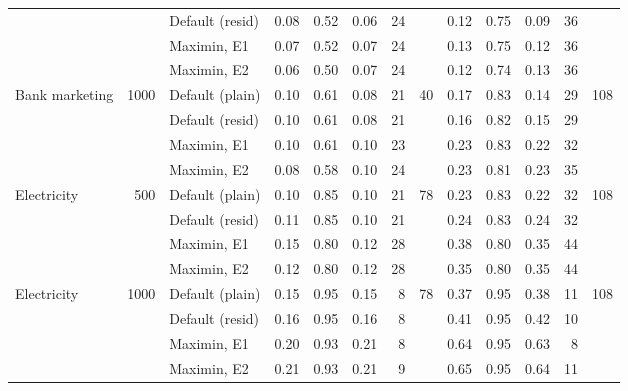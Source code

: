 {\begin{tabular}{lrl rr rrr rr rrr}
 &  & Default (resid) & 0.08 & 0.52 & 0.06 & 24 &  & 0.12 & 0.75 & 0.09 & 36 &  \\
 &  & Maximin, E1 & 0.07 & 0.52 & 0.07 & 24 &  & 0.13 & 0.75 & 0.12 & 36 &  \\
 &  & Maximin, E2 & 0.06 & 0.50 & 0.07 & 24 &  & 0.12 & 0.74 & 0.13 & 36 &  \\
\addlinespace
Bank marketing & 1000 & Default (plain) & 0.10 & 0.61 & 0.08 & 21 & 40 & 0.17 & 0.83 & 0.14 & 29 & 108 \\
 &  & Default (resid) & 0.10 & 0.61 & 0.08 & 21 &  & 0.16 & 0.82 & 0.15 & 29 &  \\
 &  & Maximin, E1 & 0.10 & 0.61 & 0.10 & 23 &  & 0.23 & 0.83 & 0.22 & 32 &  \\
 &  & Maximin, E2 & 0.08 & 0.58 & 0.10 & 24 &  & 0.23 & 0.81 & 0.23 & 35 &  \\
\addlinespace
Electricity & 500 & Default (plain) & 0.10 & 0.85 & 0.10 & 21 & 78 & 0.23 & 0.83 & 0.22 & 32 & 108 \\
 &  & Default (resid) & 0.11 & 0.85 & 0.10 & 21 &  & 0.24 & 0.83 & 0.24 & 32 &  \\
 &  & Maximin, E1 & 0.15 & 0.80 & 0.12 & 28 &  & 0.38 & 0.80 & 0.35 & 44 &  \\
 &  & Maximin, E2 & 0.12 & 0.80 & 0.12 & 28 &  & 0.35 & 0.80 & 0.35 & 44 &  \\
\addlinespace
Electricity & 1000 & Default (plain) & 0.15 & 0.95 & 0.15 & 8 & 78 & 0.37 & 0.95 & 0.38 & 11 & 108 \\
 &  & Default (resid) & 0.16 & 0.95 & 0.16 & 8 &  & 0.41 & 0.95 & 0.42 & 10 &  \\
 &  & Maximin, E1 & 0.20 & 0.93 & 0.21 & 8 &  & 0.64 & 0.95 & 0.63 & 8 &  \\
 &  & Maximin, E2 & 0.21 & 0.93 & 0.21 & 9 &  & 0.65 & 0.95 & 0.64 & 11 &  \\
\bottomrule\end{tabular}}
